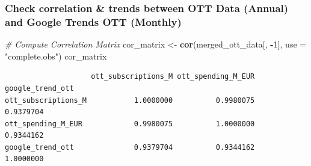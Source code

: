 \documentclass[
]{article}
\newenvironment{Shaded}{\begin{snugshade}}{\end{snugshade}}
\newcommand{\AttributeTok}[1]{\textcolor[rgb]{0.13,0.29,0.53}{#1}}
\newcommand{\CommentTok}[1]{\textcolor[rgb]{0.56,0.35,0.01}{\textit{#1}}}
\newcommand{\ConstantTok}[1]{\textcolor[rgb]{0.56,0.35,0.01}{#1}}
\newcommand{\DecValTok}[1]{\textcolor[rgb]{0.00,0.00,0.81}{#1}}
\newcommand{\FunctionTok}[1]{\textcolor[rgb]{0.13,0.29,0.53}{\textbf{#1}}}
\newcommand{\NormalTok}[1]{#1}
\newcommand{\OtherTok}[1]{\textcolor[rgb]{0.56,0.35,0.01}{#1}}
\newcommand{\SpecialCharTok}[1]{\textcolor[rgb]{0.81,0.36,0.00}{\textbf{#1}}}
\newcommand{\StringTok}[1]{\textcolor[rgb]{0.31,0.60,0.02}{#1}}
\begin{document}
\subsubsection{Check correlation \& trends between OTT Data (Annual) and
Google Trends OTT
(Monthly)}\label{check-correlation-trends-between-ott-data-annual-and-google-trends-ott-monthly}

\begin{Shaded}
\end{Shaded}

\begin{Shaded}
\begin{Highlighting}[]
\CommentTok{\# Compute Correlation Matrix}
\NormalTok{cor\_matrix }\OtherTok{\textless{}{-}} \FunctionTok{cor}\NormalTok{(merged\_ott\_data[, }\SpecialCharTok{{-}}\DecValTok{1}\NormalTok{], }\AttributeTok{use =} \StringTok{"complete.obs"}\NormalTok{)}
\NormalTok{cor\_matrix}
\end{Highlighting}
\end{Shaded}

\begin{verbatim}
                    ott_subscriptions_M ott_spending_M_EUR google_trend_ott
ott_subscriptions_M           1.0000000          0.9980075        0.9379704
ott_spending_M_EUR            0.9980075          1.0000000        0.9344162
google_trend_ott              0.9379704          0.9344162        1.0000000
\end{verbatim}
\end{document}
